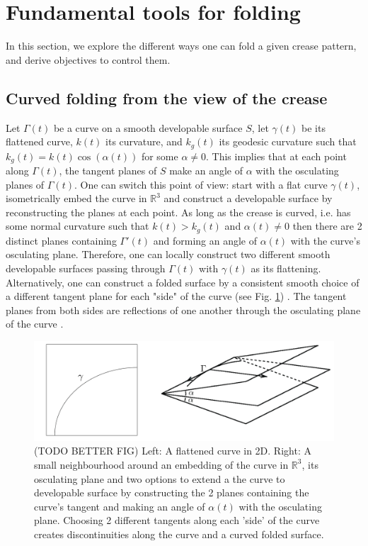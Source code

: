 \section{Fundamental tools for folding} \label{sec:folding}
In this section, we explore the different ways one can fold a given crease pattern, and derive objectives to control them.


\subsection{Curved folding from the view of the crease} \label{sec:curved_folding_from_a_curve}
Let $\Gamma(t)$ be a curve on a smooth developable surface $S$,  let $\gamma(t)$ be its flattened curve, $k(t)$ its curvature, and $k_g(t)$ its geodesic curvature such that $k_g(t) = k(t) \cos(\alpha(t))$ for some $\alpha \neq 0$. This implies that at each point along $\Gamma(t)$, the tangent planes of $S$ make an angle of $\alpha$ with the osculating planes of $\Gamma(t)$. One can switch this point of view: start with a flat curve $\gamma(t)$, isometrically embed the curve in $\mathbb{R}^3$ and construct a developable surface by reconstructing the planes at each point. As long as the crease is curved, i.e. has some normal curvature such that $k(t) > k_g(t)$ and $\alpha(t) \neq 0$ then there are 2 distinct planes containing $\Gamma'(t)$ and forming an angle of $\alpha(t)$ with the curve's osculating plane. Therefore, one can locally construct two different smooth developable surfaces passing through $\Gamma(t)$ with $\gamma(t)$ as its flattening. Alternatively, one can construct a folded surface by a consistent smooth choice of a different tangent plane for each "side" of the curve (see Fig. \ref{fig:curved_fold_through_curve}) \cite{more_on_paper}. The tangent planes from both sides are reflections of one another through the osculating plane of the curve \cite{curved_folding_kilian}.

\begin{figure} [h]
	\centering
	\includegraphics[width=0.7\linewidth]{figures/curved_fold_through_curve.pdf}
	\caption{(TODO BETTER FIG) Left: A flattened curve in 2D. Right: A small neighbourhood around an embedding of the curve in $\mathbb{R}^3$, its osculating plane and two options to extend a the curve to developable surface by constructing the 2 planes containing the curve's tangent and making an angle of $\alpha(t)$  with the osculating plane. Choosing 2 different tangents along each 'side' of the curve creates discontinuities along the curve and a curved folded surface.}
	\label{fig:curved_fold_through_curve}
\end{figure}

